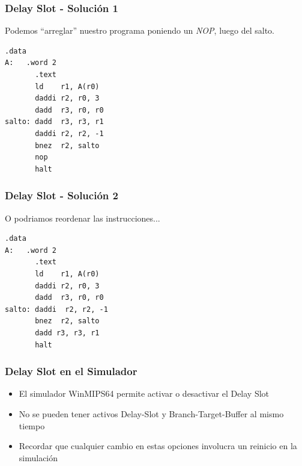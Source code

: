 \documentclass{beamer}
\begin{document}
\begin{frame}[fragile]
\frametitle{Delay Slot - Solución 1 }
Podemos ``arreglar'' nuestro programa poniendo un \emph{NOP}, luego del salto.
\begin{block}{}
\begin{lstlisting}[language=WinMIPS64,basicstyle=\ttfamily,keywordstyle=\color{blue}]
       .data
A:   .word 2
       .text
       ld    r1, A(r0)
       daddi r2, r0, 3
       dadd  r3, r0, r0
salto: dadd  r3, r3, r1
       daddi r2, r2, -1
       bnez  r2, salto
       nop
       halt
\end{lstlisting}
\end{block}
\end{frame}


\begin{frame}[fragile]
\frametitle{Delay Slot - Solución 2 }
O podriamos reordenar las instrucciones...
\begin{block}{}
\begin{lstlisting}[language=WinMIPS64,basicstyle=\ttfamily,keywordstyle=\color{blue}]
       .data
A:   .word 2
       .text
       ld    r1, A(r0)
       daddi r2, r0, 3
       dadd  r3, r0, r0
salto: daddi  r2, r2, -1
       bnez  r2, salto
       dadd r3, r3, r1
       halt
\end{lstlisting}
\end{block}
\end{frame}


\begin{frame}
\frametitle{Delay Slot en el Simulador}
\begin{itemize}
\item El simulador WinMIPS64 permite activar o desactivar el Delay Slot
\item No se pueden tener activos Delay-Slot y Branch-Target-Buffer al mismo tiempo
\item Recordar que cualquier cambio en estas opciones involucra un reinicio en la simulación
\end{itemize}
\end{frame}
\end{document}

